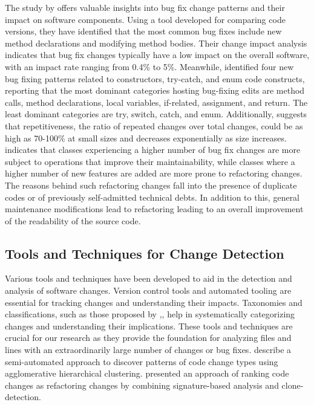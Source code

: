 \documentclass{article}
\begin{document}
The study by \cite{ufuktepe2021relation} offers valuable insights into bug fix change patterns and their impact on software components. Using a tool developed for comparing code versions, they have identified that the most common bug fixes include new method declarations and modifying method bodies. Their change impact analysis indicates that bug fix changes typically have a low impact on the overall software, with an impact rate ranging from 0.4\% to 5\%. Meanwhile, \cite{islam2021changes} identified four new bug fixing patterns related to constructors, try-catch, and enum code constructs, reporting that the most dominant categories hosting bug-fixing edits are method calls, method declarations, local variables, if-related, assignment, and return. The least dominant categories are try, switch, catch, and enum. Additionally, \cite{nguyen2013study} suggests that repetitiveness, the ratio of repeated changes over total changes, could be as high as 70-100\% at small sizes and decreases exponentially as size increases. \cite{palomba2017exploratory} indicates that classes experiencing a higher number of bug fix changes are more subject to operations that improve their maintainability, while classes where a higher number of new features are added are more prone to refactoring changes. The reasons behind such refactoring changes fall into the presence of duplicate codes or of previously self-admitted technical debts. In addition to this, general maintenance modifications lead to refactoring leading to an overall improvement of the readability of the source code.

\subsection{Tools and Techniques for Change Detection}

Various tools and techniques have been developed to aid in the detection and analysis of software changes. Version control tools and automated tooling are essential for tracking changes and understanding their impacts. Taxonomies and classifications, such as those proposed by \cite{mens2003towards} ,\cite{lehnert2012taxonomy}, help in systematically categorizing changes and understanding their implications. These tools and techniques are crucial for our research as they provide the foundation for analyzing files and lines with an extraordinarily large number of changes or bug fixes. 
\cite{fluri2008discovering} describe a semi-automated approach to discover patterns of code change types using agglomerative hierarchical clustering. \cite{weissgerber2006identifying} presented an approach of ranking code changes as refactoring changes by combining signature-based analysis and clone-detection. 



\end{document}
